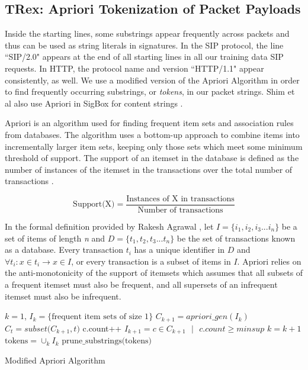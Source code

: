 \subsection{TRex: Apriori Tokenization of Packet Payloads}
Inside the starting lines, some substrings appear frequently across packets and thus can be used as string literals in signatures. In the SIP protocol, the line ``SIP/2.0" appears at the end of all starting lines in all our training data SIP requests. In HTTP, the protocol name and version ``HTTP/1.1" appear consistently, as well. We use a modified version of the Apriori Algorithm \cite{Toivonen2017} in order to find frequently occurring substrings, or \textit{tokens}, in our packet strings. Shim et al also use Apriori in SigBox for content strings \cite{Shim2017SigBoxAS}.

Apriori is an algorithm used for finding frequent item sets and association rules from databases. The algorithm uses a bottom-up approach to combine items into incrementally larger item sets, keeping only those sets which meet some minimum threshold of support. The support of an itemset in the database is defined as the number of instances of the itemset in the transactions over the total number of transactions \cite{Toivonen2017}.

\vspace{\baselineskip}

\[\text{Support(X)} = \frac{\text{Instances of X in transactions}}{\text{Number of transactions}}\] \par

\vspace{\baselineskip}

In the formal definition provided by Rakesh Agrawal \cite{Agrawal}, let $I = \{i_{1},i_{2},i_{3}...i_{n}\}$ be a set of items of length \textit{n} and $D = \{t_{1},t_{2},t_{3}...t_{n}\}$ be the set of transactions known as a database. Every transaction $t_{i}$ has a unique identifier in $D$ and $\forall t_{i} : x \in t_{i} \rightarrow x \in I$, or every transaction is a subset of items in $I$. Apriori relies on the anti-monotonicity of the support of itemsets which assumes that all subsets of a frequent itemset must also be frequent, and all supersets of an infrequent itemset must also be infrequent. \par

\begin{algorithm}
\SetAlgoLined
{}
 $k=1$, $I_{k} = \{\text{frequent item sets of size 1}\}$\;
  {
 $C_{k+1} = apriori\_gen(I_{k})$\;
  {
      $C_{t} = subset\text{(}C_{k+1}, t\text{)}$\;
       {
      c.count++\;
      }
      $I_{k+1} = c \in C_{k+1} \text{ }\vert \text{ } c.count \geq minsup$\;
   }
   $k = k + 1$\;
  }
  $\text{tokens} = \cup_{k}I_{k}$\;
  \Return $\text{prune\_substrings(tokens)}$\;
 \caption{Modified Apriori Algorithm \cite{Agrawal}}
\end{algorithm}

